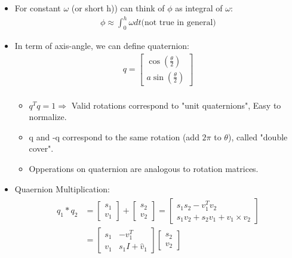 \begin{itemize}
    \item For constant $\omega$ (or short h)) can think of $\phi$ as integral of $\omega$:
    \begin{align}
        \phi \approx \int_0^h \omega dt \text{(not true in general)}
    \end{align}
    \item In term of axis-angle, we can define quaternion:
    \begin{align}
        q = \begin{bmatrix}
            \cos(\frac{\theta}{2}) \\ a \sin (\frac{\theta}{2})
        \end{bmatrix} \\
    \end{align}
    \begin{itemize}
        \item $q^T q = 1 \Rightarrow $ Valid rotations correspond to "unit quaternions", Easy to normalize.
        \item q and -q correspond to the same rotation (add $2 \pi$ to $\theta$), called "double cover".
        \item Opperations on quaternion are analogous to rotation matrices.
    \end{itemize}
    \item Quaernion Multiplication:
    \begin{align}
        \begin{split}
            q_1 * q_2 & = 
            \begin{bmatrix}
                s_1 \\ v_1
            \end{bmatrix} + 
            \begin{bmatrix}
                s_2 \\ v_2
            \end{bmatrix} =
            \begin{bmatrix}
                s_1 s_2 - v_1^T v_2 \\ s_1 v_2 + s_2 v_1 + v_1 \times v_2
            \end{bmatrix} \\
            & = \begin{bmatrix}
                s_1 & -v_1^T \\
                v_1 & s_1I + \hat v_1
            \end{bmatrix}
            \begin{bmatrix}
                s_2 \\ v_2

\end{bmatrix}
\end{split}
\end{align}
\end{itemize}
